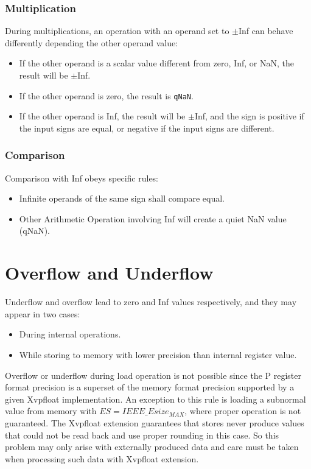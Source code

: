 \subsubsection{Multiplication}

During multiplications, an operation with an operand set to $\pm$Inf can behave differently depending the other operand value:
\begin{itemize}[topsep=0pt]
    \item If the other operand is a scalar value different from zero, Inf, or NaN, the result will be $\pm$Inf.
    \item If the other operand is zero, the result is \texttt{qNaN}.
    \item If the other operand is Inf, the result will be $\pm$Inf, and the sign is positive if the input signs are equal, or negative if the input signs are different.
\end{itemize}

\subsubsection{Comparison}
\label{sec:infcomp}

Comparison with Inf obeys specific rules:
\begin{itemize}[topsep=0pt]
    \item Infinite operands of the same sign shall compare equal.
    \item Other Arithmetic Operation involving Inf will create a quiet NaN value (qNaN).
\end{itemize}

\section{Overflow and Underflow}

Underflow and overflow lead to zero and Inf values respectively, and they may appear in two cases:
\begin{itemize}
    \item During internal operations.
    \item While storing to memory with lower precision than internal register value.
\end{itemize}

Overflow or underflow during load operation is not possible since the P register format precision is a superset of the memory format precision supported by a given Xvpfloat implementation.
An exception to this rule is loading a subnormal value from memory with $ES = IEEE\_Esize_{MAX}$, where proper operation is not guaranteed.
The Xvpfloat extension guarantees that stores never produce values that could not be read back and use proper rounding in this case.
So this problem may only arise with externally produced data and care must be taken when processing such data with Xvpfloat extension.

